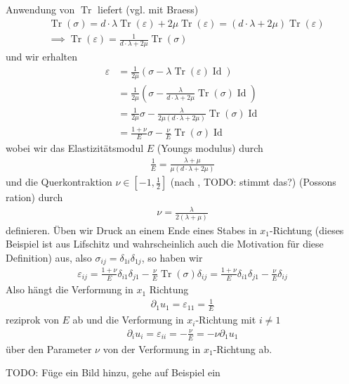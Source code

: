 \documentclass{scrartcl}
\def\e{\varepsilon}
\DeclareMathOperator{\Id}{Id}             %
\DeclareMathOperator{\Tr}{Tr}       	  %
\begin{document}
Anwendung von $\Tr$ liefert (vgl. mit Braess)
\begin{align*}
	&\Tr(\sigma)=d\cdot\lambda\Tr(\e)+2\mu\Tr(\e)=(d\cdot\lambda+2\mu)\Tr(\e) \\
	&\implies \Tr(\e) = \frac{1}{d\cdot\lambda+2\mu}\Tr(\sigma)
\end{align*}
und wir erhalten
\begin{align*}
	\e
	&=\frac{1}{2\mu}\left(\sigma-\lambda\Tr(\e)\Id\right) \\
	&=\frac{1}{2\mu}\left(\sigma-\frac{\lambda}{d\cdot\lambda+2\mu}\Tr(\sigma)\Id\right) \\
	&= \frac{1}{2\mu}\sigma-\frac{\lambda}{2\mu(d\cdot\lambda+2\mu)}\Tr(\sigma)\Id \\
	&= \frac{1+\nu}{E}\sigma-\frac{\nu}{E}\Tr(\sigma)\Id
\end{align*}
wobei wir das Elastizitätsmodul $E$ (Youngs modulus) durch
\begin{align*}
	\frac{1}{E}=\frac{\lambda+\mu}{\mu(d\cdot\lambda+2\mu)}
\end{align*}
und die Querkontraktion $\nu\in[-1,\frac{1}{2}]$ (nach \cite{Lif-1959}, TODO: stimmt das?) (Possons ration) durch 
\begin{align*}
	\nu = \frac{\lambda}{2(\lambda+\mu)}	
\end{align*}
definieren.
Üben wir Druck an einem Ende eines Stabes in $x_1$-Richtung (dieses Beispiel ist aus Lifschitz und wahrscheinlich auch die Motivation für diese Definition) aus, also $\sigma_{ij} = \delta_{1i}\delta_{1j}$, so haben wir
\begin{align*}
	\e_{ij} = \frac{1+\nu}{E}\delta_{i1}\delta_{j1}-\frac{\nu}{E}\Tr(\sigma)\delta_{ij}
	= \frac{1+\nu}{E}\delta_{i1}\delta_{j1}-\frac{\nu}{E}\delta_{ij}
\end{align*}
Also hängt die Verformung in $x_1$ Richtung
\begin{align*}
	\partial_1u_1 = \e_{11}=\frac{1}{E}
\end{align*}
reziprok von $E$ ab und die Verformung in $x_i$-Richtung mit $i\neq1$
\begin{align*}
	\partial_iu_i = \e_{ii}=-\frac{\nu}{E}=-\nu\partial_1u_1
\end{align*}
über den Parameter $\nu$ von der Verformung in $x_1$-Richtung ab.

TODO: Füge ein Bild hinzu, gehe auf Beispiel ein
\end{document}
